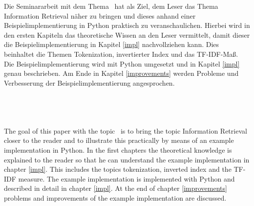 Die Seminararbeit mit dem Thema \glqq \Titel\grqq\ hat als Ziel, dem Leser das Thema Information Retrieval näher zu bringen und dieses anhand einer Beispielimplementierung in Python praktisch zu veranschaulichen. Hierbei wird in den ersten Kapiteln das theoretische Wissen an den Leser vermittelt, damit dieser die Beispielimplementierung in Kapitel \ref{impl} nachvollziehen kann. Dies beinhaltet die Themen Tokenization, invertierter Index und das TF-IDF-Maß. Die Beispielimplementierung wird mit Python umgesetzt und in Kapitel \ref{impl} genau beschrieben. Am Ende in Kapitel \ref{improvements} werden Probleme und Verbesserung der Beispielimplementierung angesprochen.
\\\\\\\\\\
The goal of this paper with the topic \glqq \Titel\grqq\ is to bring the topic Information Retrieval closer to the reader and to illustrate this practically by means of an example implementation in Python. In the first chapters the theoretical knowledge is explained to the reader so that he can understand the example implementation in chapter \ref{impl}. This includes the topics tokenization, inverted index and the TF-IDF measure. The example implementation is implemented with Python and described in detail in chapter \ref{impl}. At the end of chapter \ref{improvements} problems and improvements of the example implementation are discussed.